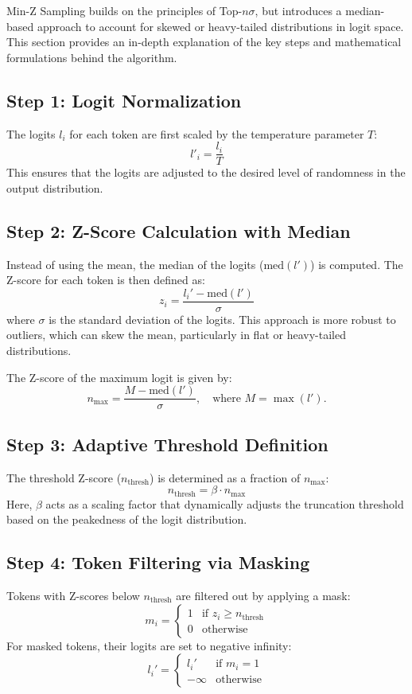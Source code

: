 \documentclass{article}
\begin{document}
Min-Z Sampling builds on the principles of Top-\( n\sigma \), but introduces a median-based approach to account for skewed or heavy-tailed distributions in logit space. This section provides an in-depth explanation of the key steps and mathematical formulations behind the algorithm.

\subsection*{Step 1: Logit Normalization}
The logits \( l_i \) for each token are first scaled by the temperature parameter \( T \):
\[
l'_i = \frac{l_i}{T}
\]
This ensures that the logits are adjusted to the desired level of randomness in the output distribution.

\subsection*{Step 2: Z-Score Calculation with Median}
Instead of using the mean, the median of the logits (\( \text{med}(l') \)) is computed. The Z-score for each token is then defined as:
\[
z_i = \frac{l_i' - \text{med}(l')}{\sigma}
\]
where \( \sigma \) is the standard deviation of the logits. This approach is more robust to outliers, which can skew the mean, particularly in flat or heavy-tailed distributions.

The Z-score of the maximum logit is given by:
\[
n_{\text{max}} = \frac{M - \text{med}(l')}{\sigma}, \quad \text{where } M = \max(l').
\]

\subsection*{Step 3: Adaptive Threshold Definition}
The threshold Z-score (\( n_{\text{thresh}} \)) is determined as a fraction of \( n_{\text{max}} \):
\[
n_{\text{thresh}} = \beta \cdot n_{\text{max}}
\]
Here, \( \beta \) acts as a scaling factor that dynamically adjusts the truncation threshold based on the peakedness of the logit distribution.

\subsection*{Step 4: Token Filtering via Masking}
Tokens with Z-scores below \( n_{\text{thresh}} \) are filtered out by applying a mask:
\[
m_i = 
\begin{cases} 
1 & \text{if } z_i \geq n_{\text{thresh}} \\
0 & \text{otherwise}
\end{cases}
\]
For masked tokens, their logits are set to negative infinity:
\[
l_i' = 
\begin{cases} 
l_i' & \text{if } m_i = 1 \\
-\infty & \text{otherwise}
\end{cases}
\]
\end{document}
